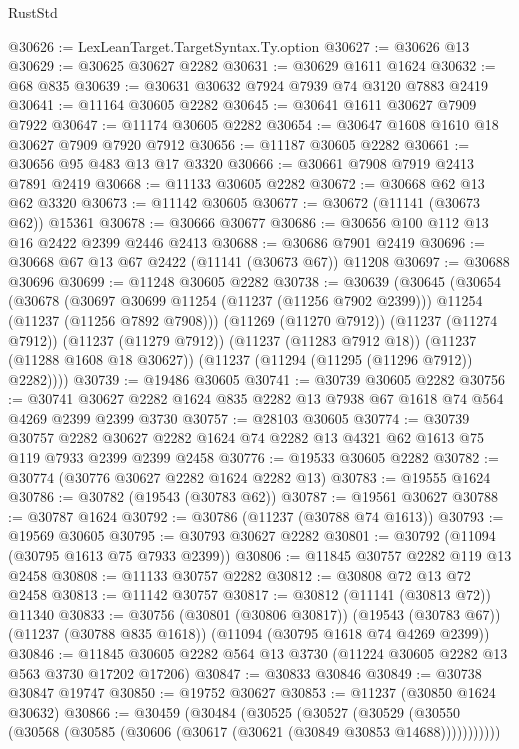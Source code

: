 \begin{lexlean}{RustStd}
\begin{coremodule}
@30626 := LexLeanTarget.TargetSyntax.Ty.option
@30627 := @30626 @13
@30629 := @30625 @30627 @2282
@30631 := @30629 @1611 @1624
@30632 := @68 @835
@30639 := @30631 @30632 @7924 @7939 @74 @3120 @7883 @2419
@30641 := @11164 @30605 @2282
@30645 := @30641 @1611 @30627 @7909 @7922
@30647 := @11174 @30605 @2282
@30654 := @30647 @1608 @1610 @18 @30627 @7909 @7920 @7912
@30656 := @11187 @30605 @2282
@30661 := @30656 @95 @483 @13 @17 @3320
@30666 := @30661 @7908 @7919 @2413 @7891 @2419
@30668 := @11133 @30605 @2282
@30672 := @30668 @62 @13 @62 @3320
@30673 := @11142 @30605
@30677 := @30672 (@11141 (@30673 @62)) @15361
@30678 := @30666 @30677
@30686 := @30656 @100 @112 @13 @16 @2422 @2399 @2446 @2413
@30688 := @30686 @7901 @2419
@30696 := @30668 @67 @13 @67 @2422 (@11141 (@30673 @67)) @11208
@30697 := @30688 @30696
@30699 := @11248 @30605 @2282
@30738 := @30639
    (@30645
      (@30654
        (@30678
          (@30697 @30699 @11254 (@11237 (@11256 @7902 @2399)))
          @11254
          (@11237 (@11256 @7892 @7908)))
        (@11269 (@11270 @7912))
        (@11237 (@11274 @7912))
        (@11237 (@11279 @7912))
        (@11237 (@11283 @7912 @18))
        (@11237 (@11288 @1608 @18 @30627))
        (@11237 (@11294 (@11295 (@11296 @7912)) @2282))))
@30739 := @19486 @30605
@30741 := @30739 @30605 @2282
@30756 := @30741 @30627 @2282 @1624 @835 @2282 @13 @7938 @67 @1618 @74 @564 @4269 @2399 @2399 @3730
@30757 := @28103 @30605
@30774 := @30739
    @30757
    @2282
    @30627
    @2282
    @1624
    @74
    @2282
    @13
    @4321
    @62
    @1613
    @75
    @119
    @7933
    @2399
    @2399
    @2458
@30776 := @19533 @30605 @2282
@30782 := @30774 (@30776 @30627 @2282 @1624 @2282 @13)
@30783 := @19555 @1624
@30786 := @30782 (@19543 (@30783 @62))
@30787 := @19561 @30627
@30788 := @30787 @1624
@30792 := @30786 (@11237 (@30788 @74 @1613))
@30793 := @19569 @30605
@30795 := @30793 @30627 @2282
@30801 := @30792 (@11094 (@30795 @1613 @75 @7933 @2399))
@30806 := @11845 @30757 @2282 @119 @13 @2458
@30808 := @11133 @30757 @2282
@30812 := @30808 @72 @13 @72 @2458
@30813 := @11142 @30757
@30817 := @30812 (@11141 (@30813 @72)) @11340
@30833 := @30756
    (@30801 (@30806 @30817))
    (@19543 (@30783 @67))
    (@11237 (@30788 @835 @1618))
    (@11094 (@30795 @1618 @74 @4269 @2399))
@30846 := @11845 @30605 @2282 @564 @13 @3730 (@11224 @30605 @2282 @13 @563 @3730 @17202 @17206)
@30847 := @30833 @30846
@30849 := @30738 @30847 @19747
@30850 := @19752 @30627
@30853 := @11237 (@30850 @1624 @30632)
@30866 := @30459
    (@30484
      (@30525
        (@30527
          (@30529 (@30550 (@30568 (@30585 (@30606 (@30617 (@30621 (@30849 @30853 @14688)))))))))))

\end{coremodule}
\end{lexlean}

